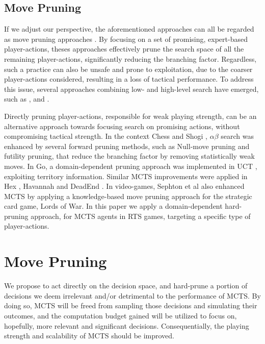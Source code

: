 \documentclass[conference]{IEEEtran}
\begin{document}
\subsection{Move Pruning}

If we adjust our perspective, the aforementioned approaches can all be regarded as move pruning approaches \cite{yang_integrating_2020}. By focusing on a set of promising, expert-based player-actions, theses approaches effectively prune the search space of all the remaining player-actions, significantly reducing the branching factor. Regardless, such a practice can also be unsafe and prone to exploitation, due to the coarser player-actions considered, resulting in a loss of tactical performance. To address this issue, several approaches combining low- and high-level search have emerged, such as \cite{barriga_combining_2017}, \cite{neufeld_hybrid_2019} and \cite{moraes_action_2018}.

Directly pruning player-actions, responsible for weak playing strength, can be an alternative approach towards focusing search on promising actions, without compromising tactical strength. In the context Chess \cite{heinz_adaptive_1999} and Shogi \cite{hoki_efficiency_2012}, $\alpha\beta$ search was enhanced by several forward pruning methods, such as Null-move pruning and futility pruning, that reduce the branching factor by removing statistically weak moves. In Go, a domain-dependent pruning approach was implemented in UCT \cite{huang_pruning_2010-1}, exploiting territory information. Similar MCTS improvements were applied in Hex \cite{arneson_monte_2010-1}, Havannah \cite{dugueperoux_pruning_2016} and DeadEnd \cite{he_game_2008-1}. In video-games, Sephton et al \cite{sephton_heuristic_2014} also enhanced MCTS by applying a knowledge-based move pruning approach for the strategic card game, Lords of War. In this paper we apply a domain-dependent hard-pruning approach, for MCTS agents in RTS games, targeting a specific type of player-actions.

\section{Move Pruning}

We propose to act directly on the decision space, and hard-prune a portion of decisions we deem irrelevant and/or detrimental to the performance of MCTS. By doing so, MCTS will be freed from sampling those decisions and simulating their outcomes, and the computation budget gained will be utilized to focus on, hopefully, more relevant and significant decisions. Consequentially, the playing strength and scalability of MCTS should be improved.
\end{document}
